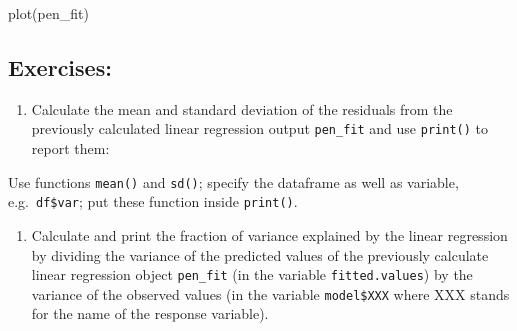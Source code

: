\documentclass[
  letterpaper,
  DIV=11,
  numbers=noendperiod]{scrreprt}
\newenvironment{Shaded}{\begin{snugshade}}{\end{snugshade}}
\newcommand{\NormalTok}[1]{\textcolor[rgb]{0.00,0.23,0.31}{#1}}
\providecommand{\tightlist}{%
  \setlength{\itemsep}{0pt}\setlength{\parskip}{0pt}}\usepackage{longtable,booktabs,array}
\begin{document}
\begin{Shaded}
\begin{Highlighting}[]
\NormalTok{plot(pen\_fit)}
\end{Highlighting}
\end{Shaded}

\hypertarget{exercises-13}{%
\subsection*{Exercises:}\label{exercises-13}}

\begin{enumerate}
\def\labelenumi{\arabic{enumi}.}
\tightlist
\item
  Calculate the mean and standard deviation of the residuals from the
  previously calculated linear regression output \texttt{pen\_fit} and
  use \texttt{print()} to report them:
\end{enumerate}

\begin{Shaded}
\begin{Highlighting}[]

\end{Highlighting}
\end{Shaded}

\begin{tcolorbox}[enhanced jigsaw, arc=.35mm, colframe=quarto-callout-caution-color-frame, left=2mm, opacitybacktitle=0.6, breakable, title=\textcolor{quarto-callout-caution-color}{\faFire}\hspace{0.5em}{Hint}, toprule=.15mm, coltitle=black, bottomtitle=1mm, toptitle=1mm, colback=white, leftrule=.75mm, colbacktitle=quarto-callout-caution-color!10!white, titlerule=0mm, opacityback=0, rightrule=.15mm, bottomrule=.15mm]

Use functions \texttt{mean()} and \texttt{sd()}; specify the dataframe
as well as variable, e.g.~\texttt{df\$var}; put these function inside
\texttt{print()}.

\end{tcolorbox}

\begin{enumerate}
\def\labelenumi{\arabic{enumi}.}
\setcounter{enumi}{1}
\tightlist
\item
  Calculate and print the fraction of variance explained by the linear
  regression by dividing the variance of the predicted values of the
  previously calculate linear regression object \texttt{pen\_fit} (in
  the variable \texttt{fitted.values}) by the variance of the observed
  values (in the variable \texttt{model\$XXX} where XXX stands for the
  name of the response variable).
\end{enumerate}
\end{document}
